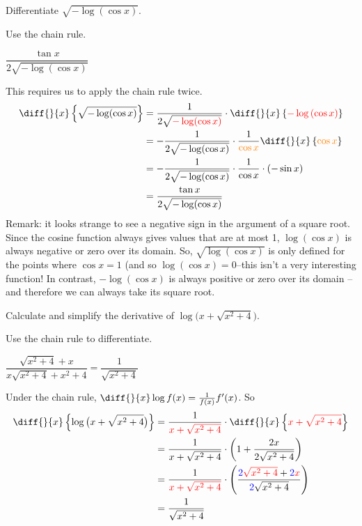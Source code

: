 \begin{question}[2015Q]
 Differentiate $\sqrt{-\log(\cos x)}$.
\end{question}
\begin{hint} Use the chain rule.
\end{hint}
\begin{answer} $\dfrac{\tan x}{2\sqrt{-\log(\cos x)}}$
\end{answer}
\begin{solution}
This requires us to apply the chain rule twice.
\begin{align*}
  \diff{}{x} \left\{ \sqrt{-\log(\cos x)} \right\}
  &= \frac{1}{2\sqrt{\textcolor{red}{-\log(\cos x)}}} \cdot \diff{}{x} \left\{ \textcolor{red}{-\log\left(\cos x\right)} \right\}\\
  &= -\frac{1}{2\sqrt{-\log(\cos x)}} \cdot \frac{1}{\textcolor{orange}{\cos x}} \diff{}{x} \left\{\textcolor{orange}{\cos x} \right\}\\
  &= -\frac{1}{2\sqrt{-\log(\cos x)}} \cdot \frac{1}{\cos x} \cdot \left(-\sin x\right)\\
  &=\frac{\tan x}{2\sqrt{-\log(\cos x)}}
\end{align*}
Remark: it looks strange to see a negative sign in the argument of a square root. Since the cosine function always gives values that are at  most 1, $\log(\cos x)$ is always negative or zero over its domain.
So, $\sqrt{\log(\cos x)}$ is only defined for the points where $\cos x=1$ (and so $\log(\cos x) = 0$--this isn't a very interesting function!
In contrast, $-\log(\cos x)$ is always positive or zero over its domain -- and therefore we can always take its square root.
\end{solution}


\begin{question}[1999H]
Calculate and simplify the derivative of
$\log\big(x+\sqrt{x^2+4}\big)$.
\end{question}
\begin{hint}
Use the chain rule to differentiate.
\end{hint}
\begin{answer} $\dfrac{\sqrt{x^2+4}+x}{x\sqrt{x^2+4}+x^2+4}=
                    \dfrac{1}{\sqrt{x^2+4}}$
\end{answer}
\begin{solution}
Under the chain rule, $\diff{}{x}\log f(x)=\frac{1}{f(x)}f'(x)$. So
\begin{align*}
\diff{}{x}\left\{\log\big(x+\sqrt{x^2+4}\big)\right\}
&=\frac{1}{\textcolor{red}{x+\sqrt{x^2+4}}} \cdot \diff{}{x}\left\{\textcolor{red}{x+\sqrt{x^2+4}}\right\}
\\
&=\frac{1}{x+\sqrt{x^2+4}}\cdot\left(1+\frac{2x}{2\sqrt{x^2+4}}\right)\\
&=\frac{1}{\textcolor{red}{x+\sqrt{x^2+4}}}\cdot
\left(\frac{\textcolor{blue}{2}\textcolor{red}{\sqrt{x^2+4}}
                           +\textcolor{blue}{2}\textcolor{red}{x}}
           {\textcolor{blue}{2}\sqrt{x^2+4}}\right)\\
&=\frac{1}{\sqrt{x^2+4}}
\end{align*}
\end{solution}


